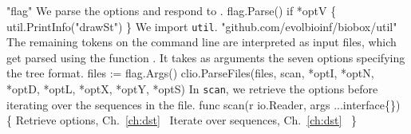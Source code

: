 "flag"
\nwendcode{}\nwdocspar
We parse the options and respond to .
\nwenddocs{}\endmoddef\nwstartdeflinemarkup{}\nwenddeflinemarkup
flag.Parse()
if *optV \{
          util.PrintInfo("drawSt")
\}
\nwendcode{}\nwdocspar
We import \texttt{util}.
\nwenddocs{}\plusendmoddef\nwstartdeflinemarkup{}\nwenddeflinemarkup
"github.com/evolbioinf/biobox/util"
\nwendcode{}\nwdocspar
The remaining tokens on the command line are interpreted as input
files, which get parsed using the function . It takes as
arguments the seven options specifying the tree format.
\nwenddocs{}\endmoddef\nwstartdeflinemarkup{}\nwenddeflinemarkup
files := flag.Args()
clio.ParseFiles(files, scan, *optI, *optN, *optD, *optL, *optX,
          *optY, *optS)
\nwendcode{}\nwdocspar
In \texttt{scan}, we retrieve the options before iterating over the
sequences in the file.
\nwenddocs{}\endmoddef\nwstartdeflinemarkup{}\nwenddeflinemarkup
func scan(r io.Reader, args ...interface\{\}) \{
          \LA{}Retrieve options, Ch.~\ref{ch:dst}~{\nwtagstyle{}}\RA{}
          \LA{}Iterate over sequences, Ch.~\ref{ch:dst}~{\nwtagstyle{}}\RA{}
\}
\nwendcode{}\nwdocspar
